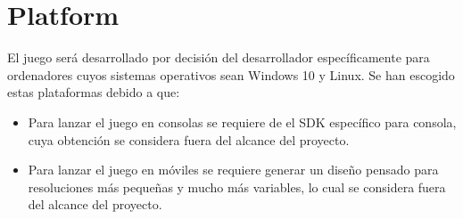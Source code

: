 \section{Platform} %

El juego será desarrollado por decisión del desarrollador específicamente para
ordenadores cuyos sistemas operativos sean Windows 10 y Linux. Se han escogido
estas plataformas debido a que:
\begin{itemize}
    \item Para lanzar el juego en consolas se requiere de el SDK específico para
   consola, cuya obtención se considera fuera del alcance del proyecto.
   \item Para lanzar el juego en móviles se requiere generar un diseño pensado
   para resoluciones más pequeñas y mucho más variables, lo cual se considera
   fuera del alcance del proyecto.
\end{itemize}